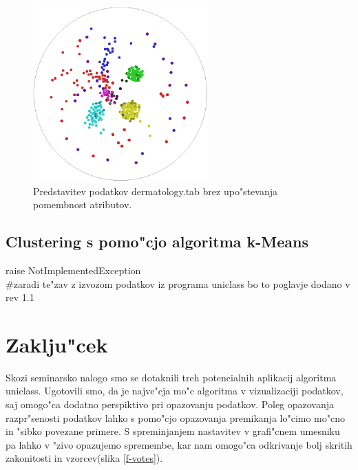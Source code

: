 \documentclass[a4paper]{article}
\begin{document}
	\begin{figure}[H]
	\begin{center}
	\includegraphics[width=0.6\textwidth]{img/der_uniclass_2.png}
	\end{center}
	\caption{Predstavitev podatkov dermatology.tab brez upo"stevanja pomembnost atributov.}
	\label{f-der-2}
	\end{figure}

	\subsection{Clustering s pomo"cjo algoritma k-Means}
		raise NotImplementedException\\
		\#zaradi te"zav z izvozom podatkov iz programa uniclass bo to poglavje dodano v rev 1.1

\section{Zaklju"cek}
	Skozi seminarsko nalogo smo se dotaknili treh potencialnih aplikacij algoritma uniclass. Ugotovili smo, da je najve"cja mo"c algoritma v vizualizaciji podatkov, saj omogo"ca dodatno perspiktivo pri opazovanju podatkov. Poleg opazovanja razpr"senosti podatkov lahko s pomo"cjo opazovanja premikanja lo"cimo mo"cno in "sibko povezane primere. S spreminjanjem nastavitev v grafi"cnem umesniku pa lahko v "zivo opazujemo spremembe, kar nam omogo"ca odkrivanje bolj skritih zakonitosti in vzorcev(slika \ref{f-votes}). 
\end{document}

